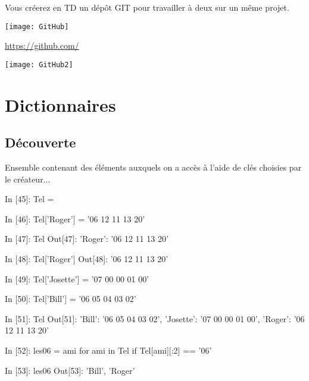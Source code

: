 \documentclass[french]{beamer}
\begin{document}
\begin{frame}
  Vous créerez en TD un dépôt GIT pour travailler à deux sur un même projet.

  
\begin{center}
  \texttt{[image: GitHub]}
\end{center}

\end{frame}


\begin{frame}
  {\LARGE \href{https://github.com/}{https://github.com/}}

  
\begin{center}
  \texttt{[image: GitHub2]}
\end{center}

\end{frame}


\section{Dictionnaires}


\subsection{Découverte}

\begin{frame}[fragile]
  Ensemble contenant des éléments auxquels on  a accès à l'aide de clés choisies
  par le créateur...

  \pause

  \begin{pythoncode}
In [45]: Tel = {}

In [46]: Tel['Roger'] = '06 12 11 13 20'

In [47]: Tel
Out[47]: {'Roger': '06 12 11 13 20'}

In [48]: Tel['Roger']
Out[48]: '06 12 11 13 20'
\end{pythoncode}

  
\end{frame}



\begin{frame}[fragile]
\begin{pythoncode}
In [49]: Tel['Josette'] = '07 00 00 01 00'

In [50]: Tel['Bill'] = '06 05 04 03 02'

In [51]: Tel
Out[51]: 
{'Bill': '06 05 04 03 02',
 'Josette': '07 00 00 01 00',
 'Roger': '06 12 11 13 20'}

In [52]: les06 = {ami for ami in Tel if Tel[ami][:2] == '06'}

In [53]: les06
Out[53]: {'Bill', 'Roger'}
\end{pythoncode}


\end{frame}
\end{document}
